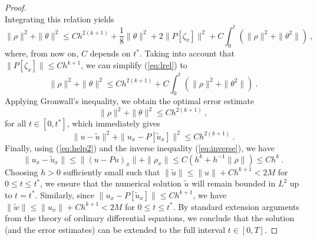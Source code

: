 \documentclass[10pt,a4paper]{amsart}
\begin{document}
\begin{proof}
\begin{equation}
\end{equation}
%
Integrating this relation yields 
\begin{equation}\label{eq:lrel}
\|\rho\|^2+\|\theta\|^2\leq C h^{2(k+1)} + \frac{1}{8}\|\theta\|^2+2\|P[\zeta_x]\|^2 + C\int_0^t (\|\rho\|^2+\|\theta^2\|)\ ,
\end{equation}
where, from now on, $C$ depends on $t^\ast$.
Taking into account that $\|P[\zeta_x]\|\leq C h^{k+1}$, we can simplify (\ref{eq:lrel}) to
\begin{equation}
\|\rho\|^2+\|\theta\|^2\leq Ch^{2(k+1)}+C\int_0^t (\|\rho\|^2+\|\theta^2\|)\ .
\end{equation}
%
Applying Gronwall's inequality, we obtain the optimal error estimate
\begin{equation}\label{eq:help2}
\|\rho\|^2+\|\theta\|^2\leq Ch^{2(k+1)}\ ,
\end{equation}
for all $t\in [0,t^\ast]$, which immediately gives
\begin{equation}
\|u-\tilde{u}\|^2+\|u_x-P[\tilde{u}_x]\|^2\leq Ch^{2(k+1)}\ .
\end{equation}
%
Finally, using (\ref{eq:help2}) and the inverse inequality (\ref{eq:inverse}), we have 
$$\|u_x-\tilde{u}_x\|\leq \|(u-Pu)_x\|+\|\rho_x\|\leq C(h^k+h^{-1}\|\rho\|)\leq Ch^k\ .$$
%
Choosing $h>0$ sufficiently small such that $\|\tilde{u}\|\leq \|u\|+Ch^{k+1}<2M$ for $0\leq t\leq t^\ast$, 
we ensure that the numerical solution $\tilde{u}$ will remain bounded in $L^2$ up to $t=t^\ast$. Similarly, since $\|u_x-P[\tilde{u}_x]\|\leq Ch^{k+1}$, we have 
$\|\tilde{w}\|\leq \|u_x\|+Ch^{k+1}<2M$ for $0\leq t\leq t^\ast$.
By standard extension arguments from the theory of ordinary differential equations, we conclude that the solution (and the error estimates) can be extended to the full interval $t\in[0,T]$. 
\end{proof}
\end{document}
